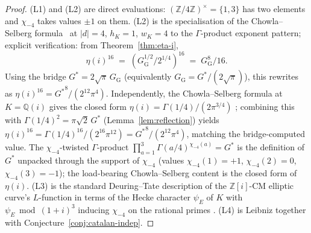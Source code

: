 \documentclass[11pt]{article}
\theoremstyle{definition}
\theoremstyle{remark}
\newcommand{\Gs}{G^{*}}
\newcommand{\GG}{G_{\!\scriptscriptstyle\mathrm{G}}}
\newcommand{\Z}{\mathbb{Z}}
\newcommand{\Q}{\mathbb{Q}}
\begin{document}
\begin{proof}
(L1) and (L2) are direct evaluations: $(\Z/4\Z)^\times = \{1, 3\}$ has
two elements and $\chi_{-4}$ takes values $\pm 1$ on them. (L2) is the
specialisation of the Chowla--Selberg formula~\cite{chowlaselberg} at
$|d| = 4$, $h_K = 1$, $w_K = 4$ to the $\Gamma$-product exponent pattern;
explicit verification: from Theorem~\ref{thm:eta-i},
\[
\eta(i)^{16} \;=\; (\GG^{1/2}/2^{1/4})^{16} \;=\; \GG^{8}/16.
\]
Using the bridge $\Gs = 2\sqrt{\pi}\,\GG$ (equivalently
$\GG = \Gs/(2\sqrt{\pi})$), this rewrites as
$\eta(i)^{16} = {\Gs}^{8}/(2^{12}\pi^{4})$.
Independently, the Chowla--Selberg formula at $K = \Q(i)$ gives the
closed form $\eta(i) = \Gamma(1/4)/(2\pi^{3/4})$
\cite{chowlaselberg,cohenII}; combining this with
$\Gamma(1/4)^{2} = \pi\sqrt{2}\,\Gs$ (Lemma~\ref{lem:reflection})
yields $\eta(i)^{16} = \Gamma(1/4)^{16}/(2^{16}\pi^{12}) = {\Gs}^{8}/(2^{12}\pi^{4})$,
matching the bridge-computed value. The $\chi_{-4}$-twisted
$\Gamma$-product $\prod_{a=1}^{3}\Gamma(a/4)^{\chi_{-4}(a)} = \Gs$ is
the definition of $\Gs$ unpacked through the support of $\chi_{-4}$
(values $\chi_{-4}(1) = +1$, $\chi_{-4}(2) = 0$, $\chi_{-4}(3) = -1$);
the load-bearing Chowla--Selberg content is the closed form of
$\eta(i)$. (L3) is the standard Deuring--Tate description of the
$\Z[i]$-CM elliptic curve's $L$-function in terms of the Hecke character
$\psi_{E}$ of $K$ with $\psi_{E} \bmod (1+i)^3$ inducing $\chi_{-4}$ on the
rational primes \cite[\S{}II.10]{silverman}. (L4) is Leibniz
\cite{whittaker-watson} together with Conjecture~\ref{conj:catalan-indep}.
\end{proof}
\end{document}
